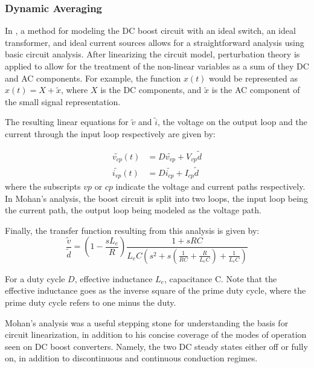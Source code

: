 \subsubsection{Dynamic Averaging}

In \cite{mohan}, a method for modeling the DC boost circuit with an ideal switch, an ideal transformer, and ideal current sources allows for a straightforward analysis using basic circuit analysis. After linearizing the circuit model, perturbation theory is applied to allow for the treatment of the non-linear variables as a sum of they DC and AC components. For example, the function $x(t)$ would be represented as $x(t) = X + \tilde{x}$, where $X$ is the DC components, and $\tilde{x}$ is the AC component of the small signal representation. 

The resulting linear equations for $\tilde{v}$ and $\tilde{i}$, the voltage on the output loop and the current through the input loop respectively are given by: 

\begin{equation}
\begin{split}
\tilde{v_{cp}}(t) &= D\tilde{v_{vp}} + V_{vp}\tilde{d} \\
\tilde{i_{vp}}(t) &= D\tilde{i_{cp}} + I_{cp}\tilde{d}
\end{split}
\end{equation}
where the subscripts $vp$ or $cp$ indicate the voltage and current paths respectively. In Mohan's analysis, the boost circuit is split into two loops, the input loop being the current path, the output loop being modeled as the voltage path. 

Finally, the transfer function resulting from this analysis is given by:
\begin{equation}
\label{thirdOrder}
\frac{\tilde{v}}{\tilde{d}} = (1-\frac{sL_e}{R}) \frac{1 + sRC}{L_eC(s^2+s(\frac{1}{RC} + \frac{R}{L_eC}) + \frac{1}{L_eC})}
\end{equation} 

For a duty cycle $D$, effective inductance $L_e$, capacitance C. Note that the effective inductance goes as the inverse square of the prime duty cycle, where the prime duty cycle refers to one minus the duty. 

Mohan's analysis was a useful stepping stone for understanding the basis for circuit linearization, in addition to his concise coverage of the modes of operation seen on DC boost converters. Namely, the two DC steady states either off or fully on, in addition to discontinuous and continuous conduction regimes. 

